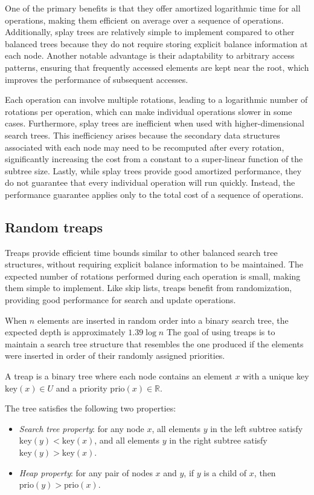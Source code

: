 One of the primary benefits is that they offer amortized logarithmic time for all operations, making them efficient on average over a sequence of operations. 
Additionally, splay trees are relatively simple to implement compared to other balanced trees because they do not require storing explicit balance information at each node. 
Another notable advantage is their adaptability to arbitrary access patterns, ensuring that frequently accessed elements are kept near the root, which improves the performance of subsequent accesses.

Each operation can involve multiple rotations, leading to a logarithmic number of rotations per operation, which can make individual operations slower in some cases. 
Furthermore, splay trees are inefficient when used with higher-dimensional search trees. 
This inefficiency arises because the secondary data structures associated with each node may need to be recomputed after every rotation, significantly increasing the cost from a constant to a super-linear function of the subtree size.
Lastly, while splay trees provide good amortized performance, they do not guarantee that every individual operation will run quickly. 
Instead, the performance guarantee applies only to the total cost of a sequence of operations.

\subsection{Random treaps}
Treaps provide efficient time bounds similar to other balanced search tree structures, without requiring explicit balance information to be maintained. 
The expected number of rotations performed during each operation is small, making them simple to implement. 
Like skip lists, treaps benefit from randomization, providing good performance for search and update operations.

When $n$ elements are inserted in random order into a binary search tree, the expected depth is approximately $1.39 \log n$
The goal of using treaps is to maintain a search tree structure that resembles the one produced if the elements were inserted in order of their randomly assigned priorities.

\begin{definition}
    A treap is a binary tree where each node contains an element $x$ with a unique key $\text{key}(x) \in U$ and a priority $\text{prio}(x) \in \mathbb{R}$. 
\end{definition}
The tree satisfies the following two properties:
\begin{itemize}
    \item \textit{Search tree property}: for any node $x$, all elements $y$ in the left subtree satisfy $\text{key}(y)<\text{key}(x)$, and all elements $y$ in the right subtree satisfy $\text{key}(y)>\text{key}(x)$.
    \item \textit{Heap property}: for any pair of nodes $x$ and $y$, if $y$ is a child of $x$, then $\text{prio}(y)>\text{prio}(x)$.
\end{itemize}

